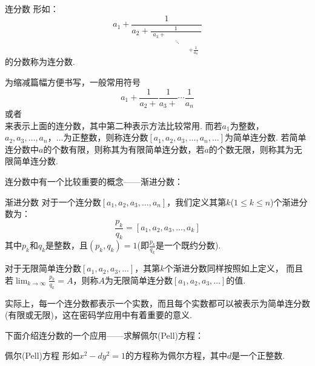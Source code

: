 \documentclass{book}
\numberwithin{equation}{subsubsection}
\begin{document}
\begin{concept}{连分数}
形如：
\begin{equation}
    a_1+\frac{1}{a_2+\frac{1}{\begin{matrix}a_3+\\&&\ddots\\&&&&+\frac{1}{a_n}\end{matrix}}}
    \nonumber
\end{equation}
的分数称为连分数.
\end{concept}

为缩减篇幅方便书写，一般常用符号
\begin{equation}
    a_1+\frac{1}{a_2+}\frac{1}{a_3+}\cdots\frac{1}{a_n}
    \nonumber
\end{equation}
或者
\begin{equation}
    [a_1,a_2,a_3,\ldots,a_n]
    \nonumber
\end{equation}
来表示上面的连分数，其中第二种表示方法比较常用.
而若$a_1$为整数，$a_2,a_3,\ldots,a_n，\ldots$为正整数，则称连分数$[a_1,a_2,a_3,\ldots,a_n,\ldots]$为简单连分数.
若简单连分数中$a$的个数有限，则称其为有限简单连分数，若$a$的个数无限，则称其为无限简单连分数.\par
连分数中有一个比较重要的概念——渐进分数：

\begin{concept}{渐进分数}
对于一个连分数$[a_1,a_2,a_3,\ldots,a_n]$，我们定义其第$k$($1\le k\le n$)个渐进分数为：
\begin{equation}
    \frac{p_k}{q_k}=[a_1,a_2,a_3,\ldots,a_k]
    \nonumber
\end{equation}
其中$p_k$和$q_k$是整数，且$(p_k,q_k)=1$(即$\frac{p_k}{q_k}$是一个既约分数).\par
\end{concept}

对于无限简单连分数$[a_1,a_2,a_3,\ldots]$，其第$k$个渐进分数同样按照如上定义，
而且若$\lim_{k\to\infty}\frac{p_k}{q_k}=A$，则称$A$为无限简单连分数$[a_1,a_2,a_3,\ldots]$的值.\par
实际上，每一个连分数都表示一个实数，而且每个实数都可以被表示为简单连分数(有限或无限)，这在密码学应用中有着重要的意义.\par
下面介绍连分数的一个应用——求解佩尔(Pell)方程：\par

\begin{concept}{佩尔(Pell)方程}
形如$x^2-dy^2=1$的方程称为佩尔方程，其中$d$是一个正整数.\par
\end{concept}
\end{document}
